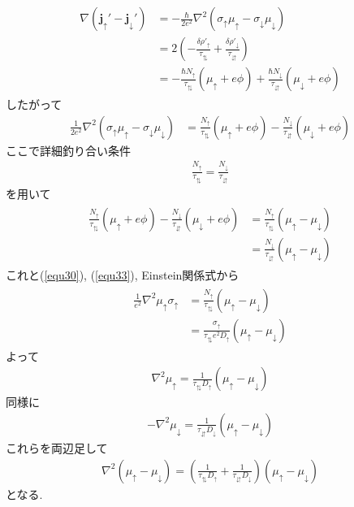 \documentclass[uplatex,a4j,11pt,dvipdfmx]{jsarticle}
\begin{document}
\begin{align}
  \begin{split}
    \nabla({\bm j}_\uparrow'-{\bm j}_\downarrow')&=-\frac{\hbar}{2e^2}\nabla^2(\sigma_\uparrow\mu_\uparrow-\sigma_\downarrow\mu_\downarrow)\\
    &=2\left(-\frac{\delta\rho'_\uparrow}{\tau_\updownarrows}+\frac{\delta\rho'_\downarrow}{\tau_\downuparrows}\right)\\
    &=-\frac{\hbar N_\uparrow}{\tau_\updownarrows}(\mu_\uparrow+e\phi)+\frac{\hbar N_\downarrow}{\tau_\downuparrows}(\mu_\downarrow+e\phi)
  \end{split}
\end{align}
したがって
\begin{align}
  \label{equ33}
  \frac{1}{2e^2}\nabla^2(\sigma_\uparrow\mu_\uparrow-\sigma_\downarrow\mu_\downarrow)&=\frac{N_\uparrow}{\tau_\updownarrows}(\mu_\uparrow+e\phi)-\frac{N_\downarrow}{\tau_\downuparrows}(\mu_\downarrow+e\phi)
\end{align}
ここで詳細釣り合い条件
\begin{align}
  \frac{N_\uparrow}{\tau_\updownarrows}=\frac{N_\downarrow}{\tau_\downuparrows}
\end{align}
を用いて
\begin{align}
  \begin{split}
    \frac{N_\uparrow}{\tau_\updownarrows}(\mu_\uparrow+e\phi)-\frac{N_\downarrow}{\tau_\downuparrows}(\mu_\downarrow+e\phi)&=\frac{N_\uparrow}{\tau_\updownarrows}(\mu_\uparrow-\mu_\downarrow)\\
    &=\frac{N_\downarrow}{\tau_\downuparrows}(\mu_\uparrow-\mu_\downarrow)
  \end{split}
\end{align}
これと(\ref{equ30}), (\ref{equ33}), Einstein関係式から
\begin{align}
  \begin{split}
    \frac{1}{e^2}\nabla^2\mu_\uparrow\sigma_\uparrow&=\frac{N_\uparrow}{\tau_\updownarrows}(\mu_\uparrow-\mu_\downarrow)\\
    &=\frac{\sigma_\uparrow}{\tau_\updownarrows e^2D_\uparrow}(\mu_\uparrow-\mu_\downarrow)
  \end{split}
\end{align}
よって
\begin{align}
  \label{equ34}
  \nabla^2\mu_\uparrow=\frac{1}{\tau_\updownarrows D_\uparrow}(\mu_\uparrow-\mu_\downarrow)
\end{align}
同様に
\begin{align}
  -\nabla^2\mu_\downarrow=\frac{1}{\tau_\downuparrows D_\downarrow}(\mu_\uparrow-\mu_\downarrow)
\end{align}
これらを両辺足して
\begin{align}
  \nabla^2(\mu_\uparrow-\mu_\downarrow)=\left(\frac{1}{\tau_\updownarrows D_\uparrow}+\frac{1}{\tau_\downuparrows D_\downarrow}\right)(\mu_\uparrow-\mu_\downarrow)
\end{align}
となる.\cite{spinOneD10:online}\cite{topo}
\clearpage
\end{document}
